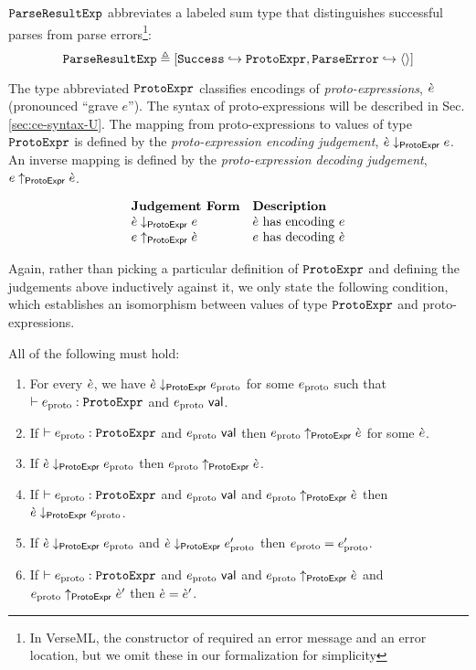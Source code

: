 \begin{enumerate}
$\mathtt{ParseResultExp}$ abbreviates a labeled sum type that distinguishes successful parses from parse errors\footnote{In VerseML, the  constructor of  required an error message and an error location, but we omit these in our formalization for simplicity}:
\[\mathtt{ParseResultExp} \triangleq [\mathtt{Success} \hookrightarrow \mathtt{ProtoExpr}, \mathtt{ParseError} \hookrightarrow \langle  \rangle]\] 

The type abbreviated $\mathtt{ProtoExpr}$ classifies encodings of \emph{proto-expressions}, $\grave{e}$ (pronounced ``grave $e$''). The syntax of proto-expressions will be described in Sec. \ref{sec:ce-syntax-U}. The mapping from proto-expressions to values of type $\mathtt{ProtoExpr}$ is defined by the \emph{proto-expression encoding judgement}, $\grave{e} \downarrow_\mathsf{ProtoExpr} e$. An inverse mapping is defined by the \emph{proto-expression decoding judgement}, $e \uparrow_\mathsf{ProtoExpr} \grave{e}$.

\[\begin{array}{ll}
\textbf{Judgement Form} & \textbf{Description}\\
\grave{e} \downarrow_\mathsf{ProtoExpr} e & \text{$\grave{e}$ has encoding $e$}\\
e \uparrow_\mathsf{ProtoExpr} \grave{e} & \text{$e$ has decoding $\grave{e}$}
\end{array}\]

Again, rather than picking a particular definition of $\mathtt{ProtoExpr}$ and defining the judgements above inductively against it, we only state the following condition, which establishes an isomorphism between values of type $\mathtt{ProtoExpr}$ and proto-expressions.

\begin{condition} All of the following must hold:
\begin{enumerate}
\item For every $\grave{e}$, we have $\grave{e} \downarrow_\mathsf{ProtoExpr} e_\text{proto}$ for some $e_\text{proto}$ such that $\vdash e_\text{proto} : \mathtt{ProtoExpr}$ and $e_\text{proto}~\mathsf{val}$.
\item If $\vdash e_\text{proto} : \mathtt{ProtoExpr}$ and $e_\text{proto}~\mathsf{val}$ then $e_\text{proto} \uparrow_\mathsf{ProtoExpr} \grave{e}$ for some $\grave{e}$.
\item If $\grave{e} \downarrow_\mathsf{ProtoExpr} e_\text{proto}$ then $e_\text{proto} \uparrow_\mathsf{ProtoExpr} \grave{e}$.
\item If $\vdash e_\text{proto} : \mathtt{ProtoExpr}$ and $e_\text{proto}~\mathsf{val}$ and $e_\text{proto} \uparrow_\mathsf{ProtoExpr} \grave{e}$ then $\grave{e} \downarrow_\mathsf{ProtoExpr} e_\text{proto}$.
\item If $\grave{e} \downarrow_\mathsf{ProtoExpr} e_\text{proto}$ and $\grave{e} \downarrow_\mathsf{ProtoExpr} e_\text{proto}'$ then $e_\text{proto}=e_\text{proto}'$.
\item If $\vdash e_\text{proto} : \mathtt{ProtoExpr}$ and $e_\text{proto}~\mathsf{val}$ and $e_\text{proto} \uparrow_\mathsf{ProtoExpr} \grave{e}$ and $e_\text{proto} \uparrow_\mathsf{ProtoExpr} \grave{e}'$ then $\grave{e}=\grave{e}'$.
\end{enumerate}
\end{condition}



\end{enumerate}

